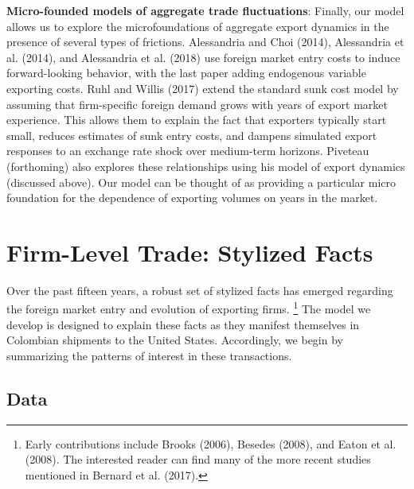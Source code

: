 \documentclass[12pt]{article}
\begin{document}
\textbf{Micro-founded models of aggregate trade fluctuations}: Finally, our
model allows us to explore the microfoundations of aggregate export dynamics
in the presence of several types of frictions. Alessandria and Choi (2014),
Alessandria et al. (2014), and Alessandria et al. (2018) use foreign market
entry costs to induce forward-looking behavior, with the last paper adding
endogenous variable exporting costs. Ruhl and Willis (2017) extend the
standard sunk cost model by assuming that firm-specific foreign demand grows
with years of export market experience. This allows them to explain the fact
that exporters typically start small, reduces estimates of sunk entry costs,
and dampens simulated export responses to an exchange rate shock over
medium-term horizons. Piveteau (forthoming) also explores these
relationships using his model of export dynamics (discussed above). Our
model can be thought of as providing a particular micro foundation for the
dependence of exporting volumes on years in the market.

\section{Firm-Level Trade: Stylized Facts}

Over the past fifteen years, a robust set of stylized facts has emerged
regarding the foreign market entry and evolution of exporting firms.%
\footnote{%
Early contributions include Brooks (2006), Besedes (2008), and Eaton et al. (2008). The
interested reader can find many of the more recent studies mentioned in
Bernard et al. (2017). } The model we develop is designed to explain these
facts as they manifest themselves in Colombian shipments to the United States. Accordingly, we begin by summarizing the patterns of interest in these transactions. 

\label{sec:data}
\subsection{Data}
\end{document}

